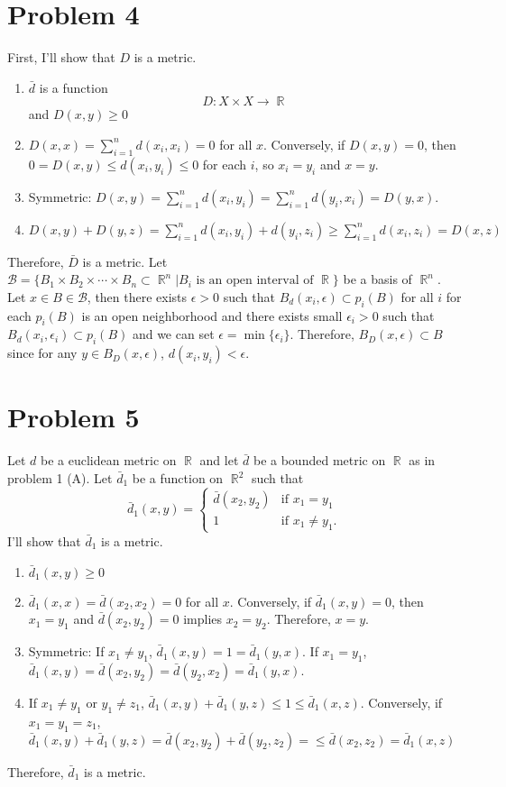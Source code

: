 \documentclass{article}
\DeclareMathOperator{\rr}{\mathbb{R}}
\newcommand{\B}{\mathcal{B}}
\begin{document}
\section*{Problem 4}
First, I'll show that $D$ is a metric.
\begin{enumerate}
\item $\bar{d}$ is a function
\begin{equation*}
D:X\times X\longrightarrow \rr
\end{equation*}
and $D(x,y)\geq 0$
\item $D(x,x)=\sum\limits_{i=1}^n d(x_i, x_i)=0$ for all $x$. Conversely, if $D(x,y)=0$, then $ 0=D(x,y)\leq d(x_i, y_i)\leq 0$ for each $i$, so $x_i=y_i$ and $x=y$.
\item Symmetric: $D(x,y)=\sum\limits_{i=1}^n d(x_i, y_i)=\sum\limits_{i=1}^n d(y_i, x_i)=D(y,x)$.
\item $D(x,y)+D(y,z)=\sum\limits_{i=1}^n d(x_i, y_i)+ d(y_i, z_i)\geq \sum\limits_{i=1}^n d(x_i, z_i)=D(x,z)$
\end{enumerate}
Therefore, $\bar{D}$ is a metric.
Let $\B=\{B_1\times B_2\times\cdots\times B_n\subset \rr^n|B_i\text{ is an open interval of }\rr\}$ be a basis of $\rr^n$. Let $x\in B\in \B$, then there exists $\epsilon>0$ such that $B_d(x_i, \epsilon)\subset p_i(B)$ for all $i$ for each $p_i(B)$ is an open neighborhood and there exists small $\epsilon_i>0$ such that $B_d(x_i, \epsilon_i)\subset p_i(B)$ and we can set $\epsilon=\min\{\epsilon_i\}$. Therefore, $B_D(x, \epsilon)\subset B$ since for any $y\in B_D(x, \epsilon)$, $d(x_i, y_i)<\epsilon$.
\section*{Problem 5}
Let $d$ be a euclidean metric on $\rr$ and let $\bar{d}$ be a bounded metric on $\rr$ as in problem 1 (A). Let $\bar{d}_1$ be a function on $\rr^2$ such that
\begin{equation*}
\bar{d}_1(x,y)=
\begin{cases}
\bar{d}(x_2,y_2) & \text{if }x_1=y_1 \\
1 & \text{if } x_1\neq y_1.
\end{cases}
\end{equation*}
I'll show that $\bar{d}_1$ is a metric.
\begin{enumerate}
\item $\bar{d}_1(x,y)\geq 0$
\item $\bar{d}_1(x,x)=\bar{d}(x_2, x_2)=0$ for all $x$. Conversely, if $\bar{d}_1(x,y)=0$, then $x_1=y_1$ and $\bar{d}(x_2,y_2)=0$ implies $x_2=y_2$. Therefore, $x=y$.
\item Symmetric: If $x_1\neq y_1$, $\bar{d}_1(x,y)=1=\bar{d}_1(y,x)$. If $x_1=y_1$, $\bar{d}_1(x,y)=\bar{d}(x_2,y_2)=\bar{d}(y_2, x_2)=\bar{d}_1(y,x)$.
\item If $x_1\neq y_1$ or $y_1\neq z_1$, $\bar{d}_1(x,y)+\bar{d}_1(y,z)\leq 1 \leq \bar{d}_1(x,z)$. Conversely, if $x_1=y_1=z_1$, $\bar{d}_1(x,y)+\bar{d}_1(y,z)=\bar{d}(x_2,y_2)+\bar{d}(y_2,z_2)=\leq \bar{d}(x_2,z_2) = \bar{d}_1(x,z)$
\end{enumerate}
Therefore, $\bar{d}_1$ is a metric.
\end{document}
